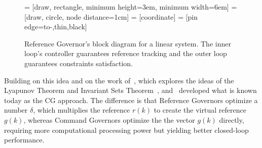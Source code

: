 \begin{figure}
  \centering
      = [draw, rectangle, minimum height=3em, minimum width=6em]
        = [draw, circle, node distance=1cm]
      = [coordinate]
   = [pin edge={to-,thin,black}]
  \caption[Reference Governor's block diagram for a linear system.]{Reference
    Governor's block diagram for a linear system. The inner loop's controller
    guarantees reference tracking and the outer loop guarantees constraints
    satisfaction.}%
  \label{fig:rg-block-diagram}
\end{figure}

Building on this idea and on the work of~\textcite{kapasouris.athans.ea:design},
which explores the ideas of the Lyapunov Theorem and Invariant Sets
Theorem~\parencite{blanchini.miani:set-theoretic},
\textcite{bemporad.casavola.ea:nonlinear}
and~\textcite{casavola.mosca.ea:robust} developed what is known today as the
\ac{CG} approach. The difference is that Reference Governors optimize a number
\(\delta\), which multiplies the reference \(r(k)\) to create the virtual reference
\(g(k)\), whereas Command Governors optimize the the vector \(g(k)\) directly,
requiring more computational processing power but yielding better closed-loop
performance.

